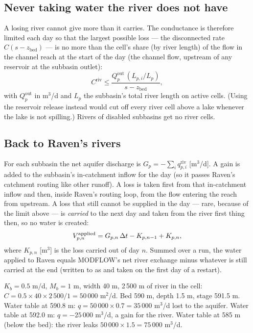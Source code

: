 \subsection{Never taking water the river does not have}
A losing river cannot give more than it carries. The conductance is therefore limited each day so that the largest
possible loss --- the disconnected rate $C(s-z_{\mathrm{bed}})$ --- is no more than the cell's share (by river length) of
the flow in the channel reach at the start of the day (the channel flow, upstream of any reservoir at the subbasin outlet):
\begin{equation}
C^{\mathrm{riv}}\le\frac{Q^{\mathrm{out}}_p\,(L_{p,i}/L_p)}{s-z_{\mathrm{bed}}},
\end{equation}
with $Q^{\mathrm{out}}_p$ in m$^3$/d and $L_p$ the subbasin's total river length on active cells. (Using the reservoir
release instead would cut off every river cell above a lake whenever the lake is not spilling.) Rivers of disabled
subbasins get no river cells.

\subsection{Back to Raven's rivers}
For each subbasin the net aquifer discharge is $G_p=-\sum_i q^{\mathrm{riv}}_{p,i}$ [m$^3$/d]. A gain is added to the
subbasin's in-catchment inflow for the day (so it passes Raven's catchment routing like other runoff). A loss is taken
first from that in-catchment inflow and then, inside Raven's routing loop, from the flow entering the reach from
upstream. A loss that still cannot be supplied in the day --- rare, because of the limit above --- is \emph{carried} to the
next day and taken from the river first thing then, so no water is created:
\begin{equation}
V^{\mathrm{applied}}_{p,n}=G_{p,n}\,\Delta t-K_{p,n-1}+K_{p,n},
\end{equation}
where $K_{p,n}$ [m$^3$] is the loss carried out of day $n$. Summed over a run, the water applied to Raven equals MODFLOW's net
river exchange minus whatever is still carried at the end (written to  as  and
taken on the first day of a restart).
\begin{example}
$K_b=0.5$ m/d, $M_b=1$ m, width 40 m, 2\,500 m of river in the cell: $C=0.5\times40\times2\,500/1=50\,000$ m$^2$/d. Bed
590 m, depth 1.5 m, stage 591.5 m. Water table at 590.8 m: $q=50\,000\times0.7=35\,000$ m$^3$/d lost to the aquifer.
Water table at 592.0 m: $q=-25\,000$ m$^3$/d, a gain for the river. Water table at 585 m (below the bed): the river
leaks $50\,000\times1.5=75\,000$ m$^3$/d.
\end{example}

